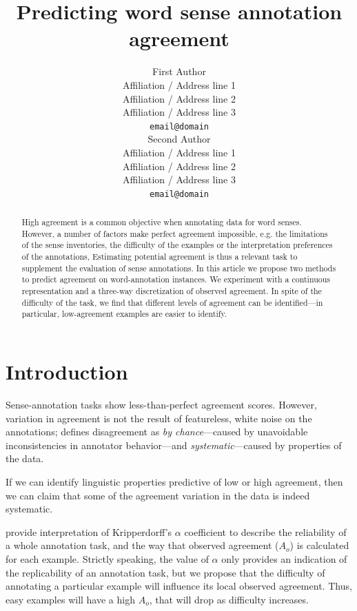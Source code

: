 \documentclass[11pt,a4paper]{article}
\title{Predicting word sense annotation agreement}
\author{First Author \\
  Affiliation / Address line 1 \\
  Affiliation / Address line 2 \\
  Affiliation / Address line 3 \\
  {\tt email@domain} \\\And
  Second Author \\
  Affiliation / Address line 1 \\
  Affiliation / Address line 2 \\
  Affiliation / Address line 3 \\
  {\tt email@domain} \\}
\date{}
\begin{document}
\maketitle
\begin{abstract}


High agreement is a common objective when annotating data for word senses.  
However, a number of factors make perfect agreement impossible, e.g. the limitations of the sense inventories, the difficulty of the examples or the interpretation preferences of the annotations,
Estimating potential agreement is thus a relevant task to supplement the evaluation of sense annotations.
In this article we propose two methods to predict agreement on word-annotation instances. We experiment with a continuous representation and a three-way discretization of observed agreement. In spite of the difficulty of the task, we find that different levels of agreement can be identified---in particular, low-agreement examples are easier to identify.
\end{abstract}
\section{Introduction}

Sense-annotation tasks show less-than-perfect agreement scores. However, variation in agreement is not the result of featureless, white noise on the annotations;  defines disagreement as \textit{by chance}---caused by unavoidable inconsistencies in annotator behavior---and \textit{systematic}---caused by properties of the data.

If we can identify linguistic properties predictive of low or high agreement, then we can claim that some of the agreement variation in the data is indeed systematic. %



 provide interpretation of Kripperdorff's $\alpha$ coefficient to describe the reliability of a whole annotation task, and the way that observed agreement ($A_o$) is calculated for each example. Strictly speaking, the value of $\alpha$ only provides an indication of the replicability of an annotation task, but we propose that the difficulty of annotating a particular example will influence its local observed agreement. Thus, easy examples will have a high $A_o$, that will drop as difficulty increases. 
\end{document}
